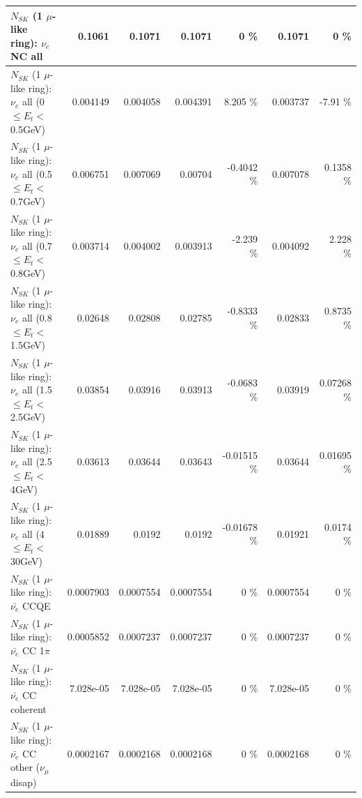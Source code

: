 \begin{table}
\begin{tabular}{| l | r | r | r  r | r  r |}
                                  $N_{SK}$ (1 $\mu$-like ring): $\nu_{e}$ NC all &          0.1061 &          0.1071 &          0.1071 &        0 \%  &          0.1071 &        0 \%  \\ 
\hline
           $N_{SK}$ (1 $\mu$-like ring): $\nu_{e}$ all (0 $\leq E_{t} <$ 0.5GeV) &        0.004149 &        0.004058 &        0.004391 &    8.205 \%  &        0.003737 &    -7.91 \%  \\ 
         $N_{SK}$ (1 $\mu$-like ring): $\nu_{e}$ all (0.5 $\leq E_{t} <$ 0.7GeV) &        0.006751 &        0.007069 &         0.00704 &  -0.4042 \%  &        0.007078 &   0.1358 \%  \\ 
         $N_{SK}$ (1 $\mu$-like ring): $\nu_{e}$ all (0.7 $\leq E_{t} <$ 0.8GeV) &        0.003714 &        0.004002 &        0.003913 &   -2.239 \%  &        0.004092 &    2.228 \%  \\ 
         $N_{SK}$ (1 $\mu$-like ring): $\nu_{e}$ all (0.8 $\leq E_{t} <$ 1.5GeV) &         0.02648 &         0.02808 &         0.02785 &  -0.8333 \%  &         0.02833 &   0.8735 \%  \\ 
         $N_{SK}$ (1 $\mu$-like ring): $\nu_{e}$ all (1.5 $\leq E_{t} <$ 2.5GeV) &         0.03854 &         0.03916 &         0.03913 &  -0.0683 \%  &         0.03919 &  0.07268 \%  \\ 
           $N_{SK}$ (1 $\mu$-like ring): $\nu_{e}$ all (2.5 $\leq E_{t} <$ 4GeV) &         0.03613 &         0.03644 &         0.03643 & -0.01515 \%  &         0.03644 &  0.01695 \%  \\ 
            $N_{SK}$ (1 $\mu$-like ring): $\nu_{e}$ all (4 $\leq E_{t} <$ 30GeV) &         0.01889 &          0.0192 &          0.0192 & -0.01678 \%  &         0.01921 &   0.0174 \%  \\ 
\hline
\hline
\hline
                                $N_{SK}$ (1 $\mu$-like ring): $\bar{\nu_e}$ CCQE &       0.0007903 &       0.0007554 &       0.0007554 &        0 \%  &       0.0007554 &        0 \%  \\ 
                           $N_{SK}$ (1 $\mu$-like ring): $\bar{\nu_e}$ CC 1$\pi$ &       0.0005852 &       0.0007237 &       0.0007237 &        0 \%  &       0.0007237 &        0 \%  \\ 
                         $N_{SK}$ (1 $\mu$-like ring): $\bar{\nu_e}$ CC coherent &       7.028e-05 &       7.028e-05 &       7.028e-05 &        0 \%  &       7.028e-05 &        0 \%  \\ 
          $N_{SK}$ (1 $\mu$-like ring): $\bar{\nu_e}$ CC other ($\nu_\mu$ disap) &       0.0002167 &       0.0002168 &       0.0002168 &        0 \%  &       0.0002168 &        0 \%  \\ 

\end{tabular}
\end{table}
